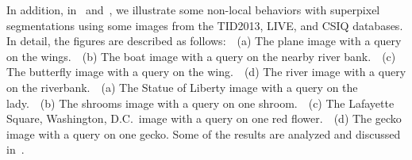 In addition, in~ and~, we illustrate some non-local behaviors with superpixel segmentations using some images from the TID2013, LIVE, and CSIQ databases. In detail, the figures are described as follows:~~(a) The plane image with a query on the wings.~~(b) The boat image with a query on the nearby river bank.~~(c) The butterfly image with a query on the wing.~~(d) The river image with a query on the riverbank.~~(a) The Statue of Liberty image with a query on the lady.~~(b) The shrooms image with a query on one shroom.~~(c) The Lafayette Square, Washington, D.C.~image with a query on one red flower.~~(d) The gecko image with a query on one gecko. Some of the results are analyzed and discussed in~.
